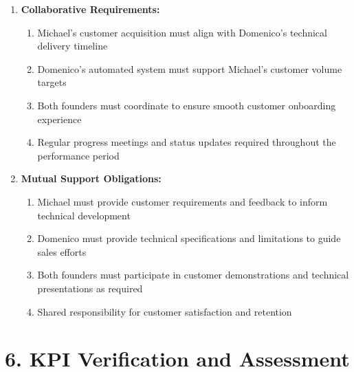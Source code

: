 \begin{enumerate}[label=\arabic*.]
\item \textbf{Collaborative Requirements:}
    \begin{enumerate}[label=(\alph*)]
    \item Michael's customer acquisition must align with Domenico's technical delivery timeline
    \item Domenico's automated system must support Michael's customer volume targets
    \item Both founders must coordinate to ensure smooth customer onboarding experience
    \item Regular progress meetings and status updates required throughout the performance period
    \end{enumerate}

\item \textbf{Mutual Support Obligations:}
    \begin{enumerate}[label=(\alph*)]
    \item Michael must provide customer requirements and feedback to inform technical development
    \item Domenico must provide technical specifications and limitations to guide sales efforts
    \item Both founders must participate in customer demonstrations and technical presentations as required
    \item Shared responsibility for customer satisfaction and retention
    \end{enumerate}
\end{enumerate}

\section*{6. KPI Verification and Assessment}

